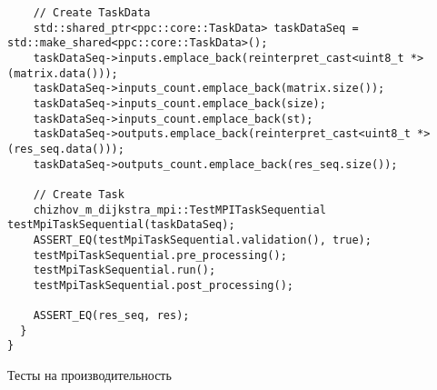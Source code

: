 \documentclass[a4paper, 14pt]{extarticle}
\begin{document}
\begin{lstlisting}
    // Create TaskData
    std::shared_ptr<ppc::core::TaskData> taskDataSeq = std::make_shared<ppc::core::TaskData>();
    taskDataSeq->inputs.emplace_back(reinterpret_cast<uint8_t *>(matrix.data()));
    taskDataSeq->inputs_count.emplace_back(matrix.size());
    taskDataSeq->inputs_count.emplace_back(size);
    taskDataSeq->inputs_count.emplace_back(st);
    taskDataSeq->outputs.emplace_back(reinterpret_cast<uint8_t *>(res_seq.data()));
    taskDataSeq->outputs_count.emplace_back(res_seq.size());

    // Create Task
    chizhov_m_dijkstra_mpi::TestMPITaskSequential testMpiTaskSequential(taskDataSeq);
    ASSERT_EQ(testMpiTaskSequential.validation(), true);
    testMpiTaskSequential.pre_processing();
    testMpiTaskSequential.run();
    testMpiTaskSequential.post_processing();

    ASSERT_EQ(res_seq, res);
  }
}
\end{lstlisting}

Тесты на производительность\\
\end{document}
